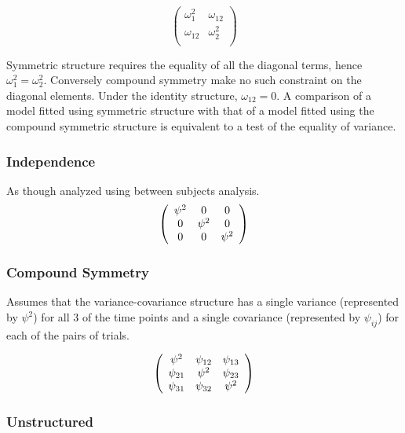 \documentclass[12pt, a4paper]{report}
\theoremstyle{plain}
\theoremstyle{definition}
\theoremstyle{remark}
\begin{document}
\[\left( \begin{array}{cc}
\omega^2_1  & \omega_{12} \\
\omega_{12} & \omega^2_2 \\
\end{array}\right) \]

Symmetric structure requires the equality of all the diagonal terms, hence $\omega^2_1 = \omega^2_2$. Conversely compound symmetry make no such constraint on the diagonal elements. Under the identity structure, $\omega_{12} = 0$.
A comparison of a model fitted using symmetric structure with that of a model fitted using the compound symmetric structure is equivalent to a test of the equality of variance.





\subsubsection{Independence}

As though analyzed using between subjects analysis.
\[
\left(
\begin{array}{c c c}
\psi^2 & 0 & 0   \\
0 & \psi^2 & 0   \\
0 & 0 & \psi^2   \\
\end{array}%
\right)
\]



\subsubsection{Compound Symmetry}

Assumes that the variance-covariance structure has a single variance (represented by $\psi^2$)
for all 3 of the time points and a single covariance (represented by $\psi_{ij}$) for each of the pairs of trials.

\[
\left(%
\begin{array}{c c c}
\psi^2 &  \psi_{12} & \psi_{13}   \\
\psi_{21} & \psi^2 & \psi_{23}   \\
\psi_{31} & \psi_{32} & \psi^2   \\
\end{array}%
\right)
\]


\subsubsection{Unstructured}
\end{document}
